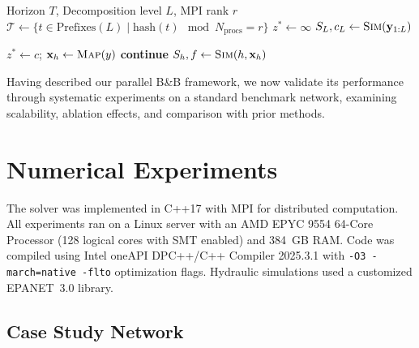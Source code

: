 \documentclass[final,3p,twocolumn]{elsarticle}
\begin{document}
\begin{algorithm}
	\footnotesize
	\caption{Parallel Branch-and-Bound}
	\label{alg:bb_solver}
	\begin{algorithmic}[1]
		\Require Horizon $T$, Decomposition level $L$, MPI rank $r$
		\State $\mathcal{T} \gets \{t \in \text{Prefixes}(L) \mid \text{hash}(t) \mod N_{\text{procs}} = r\}$
		\State $z^* \gets \infty$
		\State $S_L, c_L \gets \Call{Sim}{\mathbf{y}_{1:L}}$
		  \EndIf
		\State {} 
		\EndFor

		 \Return \EndIf
		 $z^* \gets c$;  \EndIf
		\Return
		\EndIf
		 
		\State $\mathbf{x}_h \gets \Call{Map}{y}$
		 \textbf{continue} \EndIf
		\State $S_h, f \gets \Call{Sim}{h, \mathbf{x}_h}$
		\State {}
		\State {}
		\EndIf
		\State {}
		\EndFor
		\EndProcedure
	\end{algorithmic}
\end{algorithm}

Having described our parallel B\&B framework, we now validate its performance through systematic experiments on a standard benchmark network, examining scalability, ablation effects, and comparison with prior methods.

\section{Numerical Experiments}

The solver was implemented in C++17 with MPI for distributed computation. All experiments ran on a Linux server with an AMD EPYC 9554 64-Core Processor (128 logical cores with SMT enabled) and 384~GB RAM. Code was compiled using Intel oneAPI DPC++/C++ Compiler 2025.3.1 with \texttt{-O3 -march=native -flto} optimization flags. Hydraulic simulations used a customized EPANET~3.0 library.

\subsection{Case Study Network}
\end{document}
